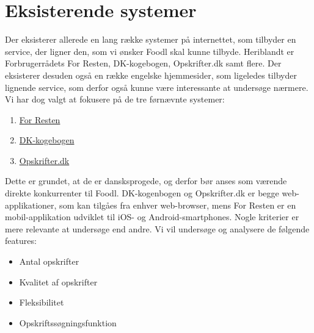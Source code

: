 \section{Eksisterende systemer}
\label{sec:existsystems}
Der eksisterer allerede en lang række systemer på internettet, som tilbyder en service, der ligner den, som vi ønsker Foodl skal kunne tilbyde. Heriblandt er Forbrugerrådets For Resten, DK-kogebogen, Opskrifter.dk samt flere. Der eksisterer desuden også en række engelske hjemmesider, som ligeledes tilbyder lignende service, som derfor også kunne være interessante at undersøge nærmere. Vi har dog valgt at fokusere på de tre førnævnte systemer: 

\begin{enumerate}[noitemsep]
  \item \href{https://play.google.com/store/apps/details?id=com.nodes.forresten}{For Resten} \cite{forresten}
  \item \href{http://dk-kogebogen.dk/}{DK-kogebogen} \cite{dkkogebogen}
  \item \href{http://opskrifter.dk/}{Opskrifter.dk} \cite{opskrifterdk}
\end{enumerate}

Dette er grundet, at de er dansksprogede, og derfor bør anses som værende direkte konkurrenter til Foodl. DK-kogenbogen og Opskrifter.dk er begge web-applikationer, som kan tilgåes fra enhver web-browser, mens For Resten er en mobil-applikation udviklet til iOS- og Android-smartphones. Nogle kriterier er mere relevante at undersøge end andre. Vi vil undersøge og analysere de følgende features:

\begin{itemize}[noitemsep]
  \item Antal opskrifter
  \item Kvalitet af opskrifter
  \item Fleksibilitet
  \item Opskriftssøgningsfunktion
\end{itemize}


